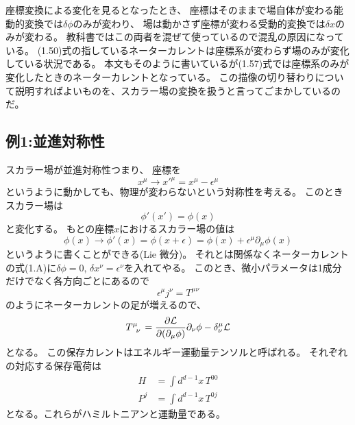 \documentclass[../../master.tex]{subfiles}
\begin{document}
座標変換による変化を見るとなったとき、
座標はそのままで場自体が変わる能動的変換では\(\delta\phi\)のみが変わり、
場は動かさず座標が変わる受動的変換では\({\delta x}\)のみが変わる。
教科書ではこの両者を混ぜて使っているので混乱の原因になっている。
(1.50)式の指しているネーターカレントは座標系が変わらず場のみが変化している状況である。
本文もそのように書いているが(1.57)式では座標系のみが変化したときのネーターカレントとなっている。
この描像の切り替わりについて説明すればよいものを、スカラー場の変換を扱うと言ってごまかしているのだ。

\subsection*{例1:並進対称性}
スカラー場が並進対称性つまり、
座標を
\begin{equation}
    x^\mu \rightarrow {x'}^\mu = x^\mu - \epsilon^\mu
\end{equation}
というように動かしても、物理が変わらないという対称性を考える。
このときスカラー場は
\begin{equation*}
    \phi'(x')=\phi(x)
\end{equation*}
と変化する。
もとの座標\(x\)におけるスカラー場の値は
\begin{equation}
    \phi(x) \rightarrow \phi'(x) = \phi(x+\epsilon) = \phi(x) + \epsilon^\mu\partial_\mu \phi(x)
\end{equation}
というように書くことができる(Lie 微分)。
それとは関係なくネーターカレントの式(1.A)に\(\delta\phi=0,\,\delta x^\nu=\epsilon^\nu\)を入れてやる。
このとき、微小パラメータは1成分だけでなく各方向ごとにあるので
\begin{equation*}
    \epsilon^\mu j^\nu = T^{\mu\nu}
\end{equation*}
のようにネーターカレントの足が増えるので、
\begin{equation}
    T\indices{^\mu_\nu} = \pdv{\mathcal{L}}{(\partial_\mu\phi)}\partial_\nu\phi - \delta_\nu^\mu \mathcal{L}
\end{equation}
となる。
この保存カレントはエネルギー運動量テンソルと呼ばれる。
それぞれの対応する保存電荷は
\begin{align}
    H &= \int d^{d-1}x\, T^{00}\\
    P^j &= \int d^{d-1}x\, T^{0j}
\end{align}
となる。これらがハミルトニアンと運動量である。
\end{document}
